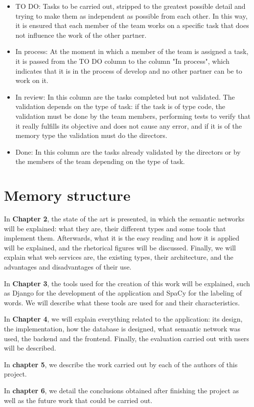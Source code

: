 \begin{itemize}
	\item TO DO: Tasks to be carried out, stripped to the greatest possible detail and trying to make them as independent as possible from each other. In this way, it is ensured that each member of the team works on a specific task that does not influence the work of the other partner.
	\item In process: At the moment in which a member of the team is assigned a task, it is passed from the TO DO column to the column "In process", which indicates that it is in the process of develop and no other partner can be to work on it.
	\item In review: In this column are the tasks completed but not validated. The validation depends on the type of task: if the task is of type code, the validation must be done by the team members, performing tests to verify that it really fulfills its objective and does not cause any error, and if it is of the memory type the validation must do the directors.
	\item Done: In this column are the tasks already validated by the directors or by the members of the team depending on the type of task.
\end{itemize} 


\section{Memory structure}
\label{sec:memory_structure}

In \textbf{Chapter 2}, the state of the art is presented, in which the semantic networks will be explained: what they are, their different types and some tools that implement them. Afterwards, what it is the easy reading and how it is applied will be explained, and the rhetorical figures will be discussed. Finally, we will explain what web services are, the existing types, their architecture, and the advantages and disadvantages of their use.


In \textbf{Chapter 3}, the tools used for the creation of this work will be explained, such as Django for the development of the application and SpaCy for the labeling of words. We will describe what these tools are used for and their characteristics.


In \textbf{Chapter 4}, we will explain everything related to the application: its design, the implementation, how the database is designed, what semantic network was used, the backend and the frontend. Finally, the evaluation carried out with users will be described.


In \textbf{chapter 5}, we describe the work carried out by each of the authors of this project.


In \textbf{chapter 6}, we detail the conclusions obtained after finishing the project as well as the future work that could be carried out.












